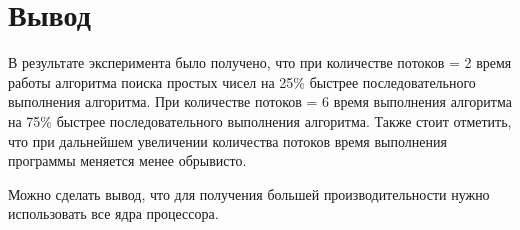 \clearpage


\section*{Вывод}
В результате эксперимента было получено, что при количестве потоков = 2 время работы алгоритма поиска простых чисел на 25\% быстрее последовательного выполнения алгоритма. При количестве потоков = 6 время выполнения алгоритма на 75\% быстрее последовательного выполнения алгоритма. Также стоит отметить, что при дальнейшем увеличении количества потоков время выполнения программы меняется менее обрывисто.  

Можно сделать вывод, что для получения большей производительности нужно использовать все ядра процессора.